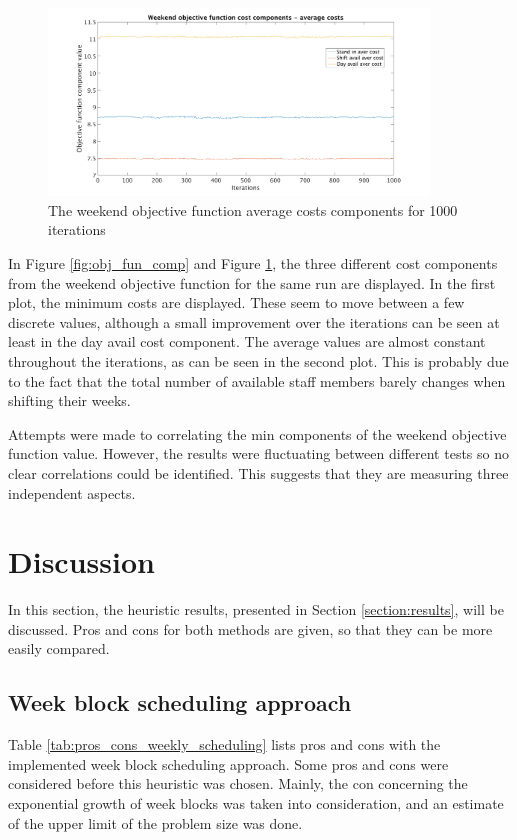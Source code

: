 \begin{figure}[!h]
\centering
\includegraphics[width=0.9\textwidth, trim = 100px 0px 100px 20px, clip]{Chapters/ImagesEmelie/Components_av_1000_20.png}
\caption{The weekend objective function average costs components for 1000 iterations}
\label{fig:obj_fun_comp_aver}
\end{figure}


In Figure \ref{fig:obj_fun_comp} and Figure \ref{fig:obj_fun_comp_aver}, the three different cost components from the weekend objective function for the same run are displayed. In the first plot, the minimum costs are displayed. These seem to move between a few discrete values, although a small improvement over the iterations can be seen at least in the day avail cost component. The average values are almost constant throughout the iterations, as can be seen in the second plot. This is probably due to the fact that the total number of available staff members barely changes when shifting their weeks.

Attempts were made to correlating the min components of the weekend objective function value. However, the results were fluctuating between different tests so no clear correlations could be identified. This suggests that they are measuring three independent aspects.

\section{Discussion}
In this section, the heuristic results, presented in Section \ref{section:results}, will be discussed. Pros and cons for both methods are given, so that they can be more easily compared.


\subsection{Week block scheduling approach}
Table \ref{tab:pros_cons_weekly_scheduling} lists pros and cons with the implemented week block scheduling approach. Some pros and cons were considered before this heuristic was chosen. Mainly, the con concerning the exponential growth of week blocks was taken into consideration, and an estimate of the upper limit of the problem size was done.

